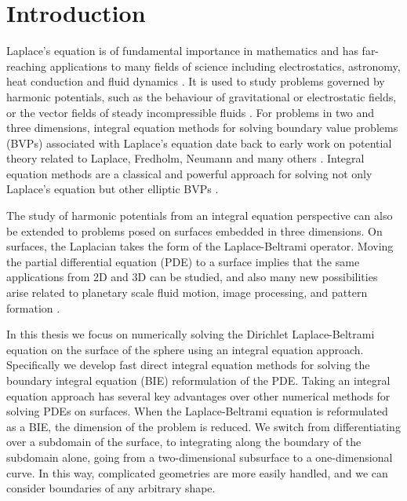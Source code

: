 \documentclass{sfuthesis}
\begin{document}
\tableofcontents\clearpage
{}\listoftables\clearpage
{}\listoffigures


%
%

\mainmatter

\chapter{Introduction}

Laplace's equation is of fundamental importance in mathematics and has far-reaching applications to many fields of science including electrostatics, astronomy, heat conduction and fluid dynamics \cite{Evans98, Strauss2008, Griffiths}. It is used to study problems governed by harmonic potentials, such as the behaviour of gravitational or electrostatic fields, or the vector fields of steady incompressible fluids \cite{Evans98, Strauss2008, Griffiths}. For problems in two and three dimensions, integral equation methods for solving boundary value problems (BVPs) associated with Laplace's equation date back to early work on potential theory related to Laplace, Fredholm, Neumann and many others \cite{Atk97, Kress99}. Integral equation methods are a classical and powerful approach for solving not only Laplace's equation but other elliptic BVPs \cite{Atk97, Kress99,Colton2013, Ingham2012}. 

The study of harmonic potentials from an integral equation perspective can also be extended to problems posed on surfaces embedded in three dimensions. On surfaces, the Laplacian takes the form of the Laplace-Beltrami operator.  Moving the partial differential equation (PDE) to a surface implies that the same applications from 2D and 3D can be studied, and also many new possibilities arise related to planetary scale fluid motion, image processing, and pattern formation \cite{Chap2001, Myers2004, Wit91}. 

In this thesis we focus on numerically solving the Dirichlet Laplace-Beltrami equation on the surface of the sphere using an integral equation approach. Specifically we develop fast direct integral equation methods for solving the boundary integral equation (BIE) reformulation of the PDE. Taking an integral equation approach has several key advantages over other numerical methods for solving PDEs on surfaces. When the Laplace-Beltrami equation is reformulated as a BIE, the dimension of the problem is reduced. We switch from differentiating over a subdomain of the surface, to integrating along the boundary of the subdomain alone, going from a two-dimensional subsurface to a one-dimensional curve. In this way, complicated geometries are more easily handled, and we can consider boundaries of any arbitrary shape. 
\end{document}
